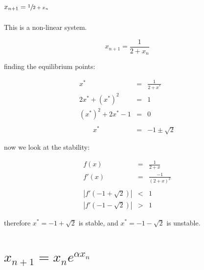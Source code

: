 \documentclass{report}
\begin{document}
%
%
%
%







\section{$x_{n + 1} = \sfrac{1}{2 + x_n}$}

This is a non-linear system. \bigskip

\[
    x_{n + 1} = \frac{1}{2 + x_n}
\]\medskip

finding the equilibrium points: \bigskip

\begin{eqnarray*}
                             x^* & = & \frac{1}{2 + x^*} \\
                 2 x^* + (x^*)^2 & = & 1 \\
             (x^*)^2 + 2 x^* - 1 & = & 0 \\\\
                      \qquad x^* & = & -1 \pm \sqrt{2}
\end{eqnarray*}\medskip

now we look at the stability: \bigskip

\begin{eqnarray*}
                            f(x) & = & \frac{1}{2 + x} \\
                           f'(x) & = & \frac{-1}{(2 + x)^2} \\\\
\left| f'(-1 + \sqrt{2}) \right| & < & 1 \\
\left| f'(-1 - \sqrt{2}) \right| & > & 1
\end{eqnarray*}\medskip

therefore $x^* = -1 + \sqrt{2}$ is stable, and $x^* = -1 - \sqrt{2}$ is unstable. \bigskip







\section{$x_{n + 1} = x_n e^{\alpha x_n}$}
\end{document}
